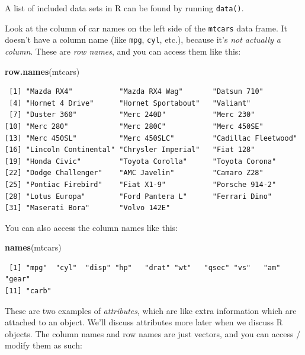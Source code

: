 \documentclass[
]{article}
\newenvironment{Shaded}{\begin{snugshade}}{\end{snugshade}}
\newcommand{\KeywordTok}[1]{\textcolor[rgb]{0.13,0.29,0.53}{\textbf{#1}}}
\newcommand{\NormalTok}[1]{#1}
\newenvironment{bonus}{
  \specialblock{bonus}{sun-fill.png}{Bonus}
}{\endspecialblock}
\begin{document}
\begin{bonus}
A list of included data sets in R can be found by running
\texttt{data()}.
\end{bonus}

Look at the column of car names on the left side of the \texttt{mtcars} data frame.
It doesn't have a column name (like \texttt{mpg}, \texttt{cyl}, etc.), because it's \emph{not actually a column}.
These are \emph{row names}, and you can access them like this:

\begin{Shaded}
\begin{Highlighting}[]
\KeywordTok{row.names}\NormalTok{(mtcars)}
\end{Highlighting}
\end{Shaded}

\begin{verbatim}
 [1] "Mazda RX4"           "Mazda RX4 Wag"       "Datsun 710"         
 [4] "Hornet 4 Drive"      "Hornet Sportabout"   "Valiant"            
 [7] "Duster 360"          "Merc 240D"           "Merc 230"           
[10] "Merc 280"            "Merc 280C"           "Merc 450SE"         
[13] "Merc 450SL"          "Merc 450SLC"         "Cadillac Fleetwood" 
[16] "Lincoln Continental" "Chrysler Imperial"   "Fiat 128"           
[19] "Honda Civic"         "Toyota Corolla"      "Toyota Corona"      
[22] "Dodge Challenger"    "AMC Javelin"         "Camaro Z28"         
[25] "Pontiac Firebird"    "Fiat X1-9"           "Porsche 914-2"      
[28] "Lotus Europa"        "Ford Pantera L"      "Ferrari Dino"       
[31] "Maserati Bora"       "Volvo 142E"         
\end{verbatim}

You can also access the column names like this:

\begin{Shaded}
\begin{Highlighting}[]
\KeywordTok{names}\NormalTok{(mtcars)}
\end{Highlighting}
\end{Shaded}

\begin{verbatim}
 [1] "mpg"  "cyl"  "disp" "hp"   "drat" "wt"   "qsec" "vs"   "am"   "gear"
[11] "carb"
\end{verbatim}

These are two examples of \emph{attributes}, which are like extra information which are attached to an object.
We'll discuss attributes more later when we discuss R objects.
The column names and row names are just vectors, and you can access / modify them as such:
\end{document}
